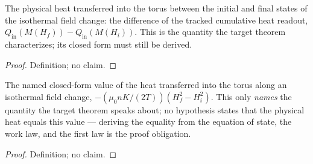 \begin{definition}
\label{def:IPhO2026Problems_problem_IPhO_2026_3_B_1:HeatTransferredIntoTorus}
The physical heat transferred into the torus between the initial and final
states of the isothermal field change: the difference of the tracked
cumulative heat readout,
$Q_{\mathrm{in}}(M(H_f)) - Q_{\mathrm{in}}(M(H_i))$.  This is the quantity
the target theorem characterizes; its closed form must still be derived.
\end{definition}
\begin{proof}
Definition; no claim.
\end{proof}

\begin{definition}
\label{def:IPhO2026Problems_problem_IPhO_2026_3_B_1:HeatIntoTorusValue}
The named closed-form value of the heat transferred into the torus along an
isothermal field change, $-(\mu_0 n K/(2T))(H_f^2 - H_i^2)$.  This only
\emph{names} the quantity the target theorem speaks about; no hypothesis
states that the physical heat equals this value --- deriving the equality
from the equation of state, the work law, and the first law is the proof
obligation.
\end{definition}
\begin{proof}
Definition; no claim.
\end{proof}

